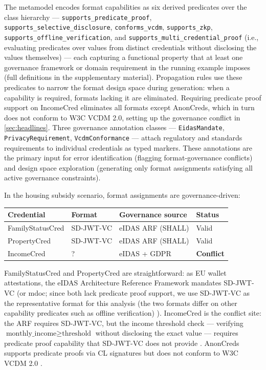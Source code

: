 The metamodel encodes format capabilities as six derived predicates over the class hierarchy --- \texttt{supports\_predicate\_proof}, \texttt{supports\_selective\_disclosure}, \texttt{conforms\_vcdm}, \texttt{supports\_zkp}, \texttt{supports\_offline\_verification}, and \texttt{supports\_multi\_credential\_proof} (i.e., evaluating predicates over values from distinct credentials without disclosing the values themselves) --- each capturing a functional property that at least one governance framework or domain requirement in the running example imposes (full definitions in the supplementary material). Propagation rules use these predicates to narrow the format design space during generation: when a capability is required, formats lacking it are eliminated. Requiring predicate proof support on IncomeCred eliminates all formats except AnonCreds, which in turn does not conform to W3C VCDM 2.0, setting up the governance conflict in \autoref{sec:headlines}. Three governance annotation classes --- \texttt{EidasMandate}, \texttt{PrivacyRequirement}, \texttt{VcdmConformance} --- attach regulatory and standards requirements to individual credentials as typed markers. These annotations are the primary input for error identification (flagging format-governance conflicts) and design space exploration (generating only format assignments satisfying all active governance constraints).

In the housing subsidy scenario, format assignments are governance-driven:

\begin{center}
\small
\setlength{\tabcolsep}{4pt}
\begin{tabularx}{\columnwidth}{LLLL}
\toprule
Credential & Format & Governance source & Status \\
\midrule
FamilyStatusCred & SD-JWT-VC & eIDAS ARF (SHALL) & Valid \\
PropertyCred & SD-JWT-VC & eIDAS ARF (SHALL) & Valid \\
IncomeCred & ? & eIDAS + GDPR & \textbf{Conflict} \\
\bottomrule
\end{tabularx}
\end{center}

FamilyStatusCred and PropertyCred are straightforward: as EU wallet attestations, the eIDAS Architecture Reference Framework mandates SD-JWT-VC (or mdoc; since both lack predicate proof support, we use SD-JWT-VC as the representative format for this analysis (the two formats differ on other capability predicates such as offline verification) \citep{noauthor_eu-digital-identity-walleteudi-doc-architecture-and-reference-framework_2026}). IncomeCred is the conflict site: the ARF requires SD-JWT-VC, but the income threshold check --- verifying \(\text{monthly\_income} \geq \text{threshold}\) without disclosing the exact value --- requires predicate proof capability that SD-JWT-VC does not provide \citep{terbu_sd-jwt-based_2026}. AnonCreds supports predicate proofs via CL signatures \citep{curran2022anoncreds} but does not conform to W3C VCDM 2.0 \citep{manu_verifiable_2025}.

